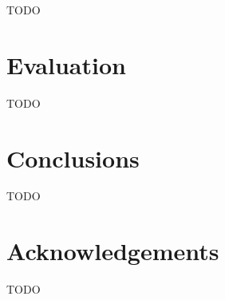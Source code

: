 \documentclass[10pt,onecolumn]{article}
\begin{document}
TODO

\section*{Evaluation}

TODO

\section*{Conclusions}

TODO

\section*{Acknowledgements}

TODO

\nocite{*}



\end{document}
